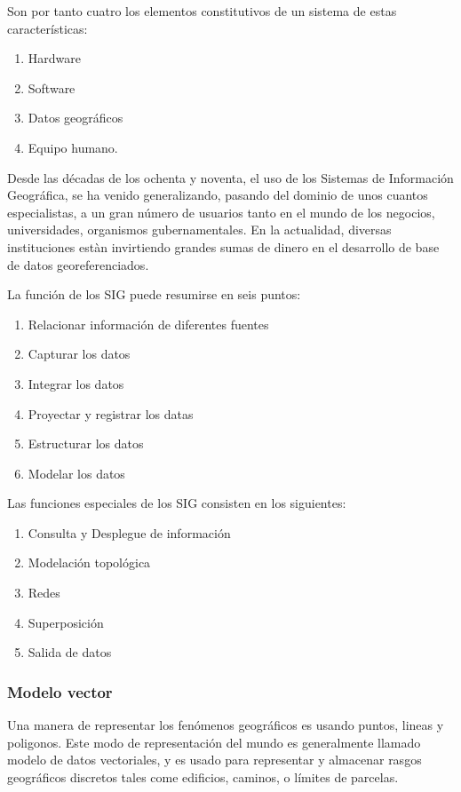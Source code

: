 Son por tanto cuatro los elementos constitutivos de un sistema de estas características:

\begin{enumerate}
    \item Hardware
    \item Software
    \item Datos geográficos
    \item Equipo humano.
\end{enumerate}

Desde las décadas de los ochenta y noventa, el uso de los Sistemas de Información Geográfica, se ha venido generalizando, pasando del dominio de unos cuantos especialistas, a un gran número de usuarios tanto en el mundo de los negocios, universidades, organismos gubernamentales.  En la actualidad, diversas instituciones estàn invirtiendo grandes sumas de dinero en el desarrollo de base de datos georeferenciados.

La función de los SIG puede resumirse en seis puntos:

\begin{enumerate}
    \item Relacionar información de diferentes fuentes
    \item Capturar los datos 
    \item Integrar los datos
    \item Proyectar y registrar los datas
    \item Estructurar los datos
    \item Modelar los datos
\end{enumerate}

Las funciones especiales de los SIG consisten en los siguientes:

\begin{enumerate}
    \item Consulta y Desplegue de información
    \item Modelación topológica
    \item Redes
    \item Superposición
    \item Salida de datos
\end{enumerate}

\subsubsection{Modelo vector}

Una manera de representar los fenómenos geográficos es usando puntos, lineas y poligonos. Este modo de representación del mundo es generalmente llamado modelo de datos vectoriales, y es usado para representar y almacenar rasgos geográficos discretos tales come edificios, caminos, o límites de parcelas.

